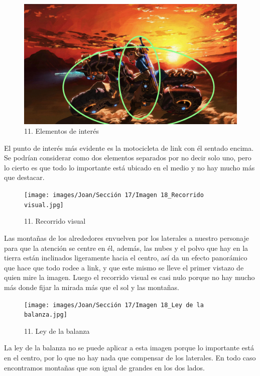 \documentclass[12pt]{article}
\begin{document}
        \begin{figure}[H]
          \centering
          \includegraphics[scale=0.35]{images/Joan/Sección 17/Imagen 18_Elementos de interés.jpg}
          \caption{\small 11. Elementos de interés}
        \end{figure}
        El punto de interés más evidente es la motocicleta de link con él sentado encima. Se podrían considerar como dos elementos separados por no decir solo uno, pero lo cierto es que todo lo importante está ubicado en el medio y no hay mucho más que destacar. 

        \begin{figure}[H]
          \centering
          \texttt{[image: images/Joan/Sección 17/Imagen 18\_Recorrido visual.jpg]}
          \caption{\small 11. Recorrido visual}
        \end{figure}
        Las montañas de los alrededores envuelven por los laterales a nuestro personaje para que la atención se centre en él, además, las nubes y el polvo que hay en la tierra están inclinados ligeramente hacia el centro, así da un efecto panorámico que hace que todo rodee a link, y que este mismo se lleve el primer vistazo de quien mire la imagen. 
    Luego el recorrido visual es casi nulo porque no hay mucho más donde fijar la mirada más que el sol y las montañas. 

    \begin{figure}[H]
          \centering
          \texttt{[image: images/Joan/Sección 17/Imagen 18\_Ley de la balanza.jpg]}
          \caption{\small 11. Ley de la balanza}
        \end{figure}
        La ley de la balanza no se puede aplicar a esta imagen porque lo importante está en el centro, por lo que no hay nada que compensar de los laterales. En todo caso encontramos montañas que son igual de grandes en los dos lados. 
\end{document}
